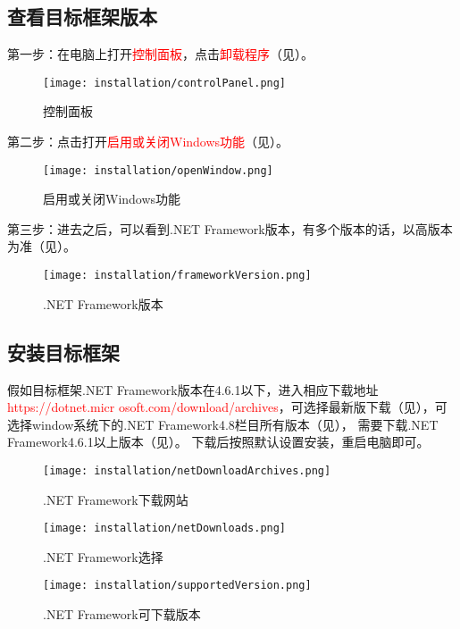 \subsection{查看目标框架版本}
\par 第一步：在电脑上打开\textcolor{red}{控制面板}，点击\textcolor{red}{卸载程序}（见）。
\begin{figure}[H]
    \centering
    \texttt{[image: installation/controlPanel.png]}
    \caption{ 控制面板 \label{fig:controlPanel}}
\end{figure}
\par 第二步：点击打开\textcolor{red}{启用或关闭Windows功能}（见）。
\begin{figure}[H]
    \centering
    \texttt{[image: installation/openWindow.png]}
    \caption{ 启用或关闭Windows功能 \label{fig:openWindow}}
\end{figure}
\par 第三步：进去之后，可以看到.NET Framework版本，有多个版本的话，以高版本为准（见）。
\begin{figure}[H]
    \centering
    \texttt{[image: installation/frameworkVersion.png]}
    \caption{ .NET Framework版本 \label{fig:frameworkVersion}}
\end{figure}

\subsection{安装目标框架}
假如目标框架.NET Framework版本在4.6.1以下，进入相应下载地址\textcolor{red}{https://dotnet.micr
osoft.com/download/archives}，可选择最新版下载（见），可选择window系统下的.NET Framework4.8栏目所有版本（见），
需要下载.NET Framework4.6.1以上版本（见）。
下载后按照默认设置安装，重启电脑即可。
\begin{figure}[H]
    \centering
    \texttt{[image: installation/netDownloadArchives.png]}
    \caption{ .NET Framework下载网站 \label{fig:netDownloadArchives}}
\end{figure}
\begin{figure}[H]
    \centering
    \texttt{[image: installation/netDownloads.png]}
    \caption{ .NET Framework选择 \label{fig:netDownloads}}
\end{figure}
\begin{figure}[H]
    \centering
    \texttt{[image: installation/supportedVersion.png]}
    \caption{ .NET Framework可下载版本 \label{fig:supportedVersion}}
\end{figure}

